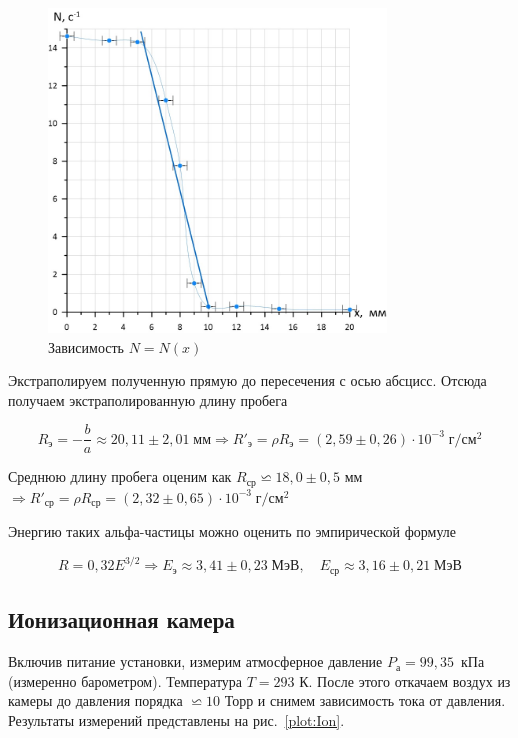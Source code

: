 \documentclass[a4paper, 12pt]{article}
\begin{document}
\begin{figure}[h]
\begin{center}
\includegraphics[width = 0.8\textwidth]{plotGeyger.jpg}
\caption{Зависимость $N = N(x)$}
\label{plot:Geyger}
\end{center}
\end{figure}

Экстраполируем полученную прямую до пересечения с осью абсцисс. Отсюда получаем экстраполированную длину пробега
		 
		 \begin{equation}\label{}
		 R_э = -\dfrac{b}{a} \approx 20,11 \pm 2,01 \; мм \Rightarrow R'_э = \rho R_э = (2,59 \pm 0,26)\cdot 10^{-3} \; г/см^2
		 \end{equation}
		
		Среднюю длину пробега оценим как $ R_{ср} \backsimeq 18,0 \pm 0,5 $ мм $ \Rightarrow R'_{ср} = \rho R_{ср} = (2,32 \pm 0,65)\cdot 10^{-3} \; г/см^2 $
		
		Энергию таких альфа-частицы можно оценить по эмпирической формуле 
		
		\begin{equation}\label{}
		R = 0,32 E^{3/2} \Rightarrow E_э \approx 3,41 \pm 0,23 \; МэВ, \quad E_{ср} \approx 3,16 \pm 0,21 \; МэВ
		\end{equation}
		
\subsection{Ионизационная камера}

Включив питание установки, измерим атмосферное давление $ P_а = 99,35 $~кПа (измеренно барометром). Температура $ T = 293 $ К. После этого откачаем воздух из камеры до давления порядка $ \backsimeq 10 $ Торр и снимем зависимость тока от давления. Результаты измерений представлены на рис.~\ref{plot:Ion}.
\end{document}
